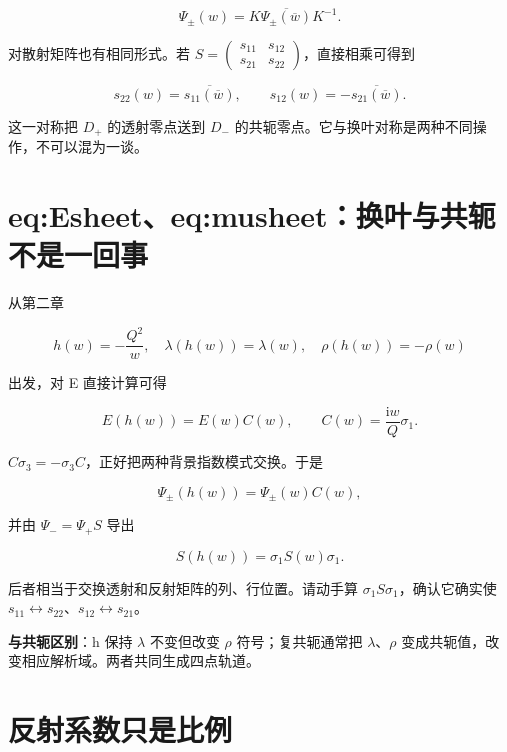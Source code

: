 \[
\Psi_\pm(w)=K\overline{\Psi_\pm(\overline w)}K^{-1}.
\]

对散射矩阵也有相同形式。若 $S=\begin{pmatrix}s_{11}&s_{12}\\s_{21}&s_{22}\end{pmatrix}$，直接相乘可得到\par

\[
s_{22}(w)=\overline{s_{11}(\overline w)},
\qquad
s_{12}(w)=-\overline{s_{21}(\overline w)}.
\]

这一对称把 $D_{+}$ 的透射零点送到 $D_{-}$ 的共轭零点。它与换叶对称是两种不同操作，不可以混为一谈。\par

\section{eq:Esheet、eq:musheet：换叶与共轭不是一回事}

从第二章\par

\[
h(w)=-\dfrac{Q^2}{w},\quad
\lambda(h(w))=\lambda(w),\quad \rho(h(w))=-\rho(w)
\]

出发，对 E 直接计算可得\par

\[
E(h(w))=E(w)C(w),
\qquad
C(w)=\dfrac{\mathrm{i}w}{Q}\sigma_1.
\]

$C \sigma{}_{3}=-\sigma{}_{3} C$，正好把两种背景指数模式交换。于是\par

\[
\Psi_\pm(h(w))=\Psi_\pm(w)C(w),
\]

并由 $\Psi{}_{-}=\Psi{}_{+}S$ 导出\par

\[
S(h(w))=\sigma_1S(w)\sigma_1.
\]

后者相当于交换透射和反射矩阵的列、行位置。请动手算 $\sigma{}_{1}S\sigma{}_{1}$，确认它确实使 $s_{11}\leftrightarrow{}s_{22}$、$s_{12}\leftrightarrow{}s_{21}$。\par

\textbf{与共轭区别}：h 保持 $\lambda{}$ 不变但改变 $\rho{}$ 符号；复共轭通常把 $\lambda{}$、$\rho{}$ 变成共轭值，改变相应解析域。两者共同生成四点轨道。\par

\section{反射系数只是比例}
\par

